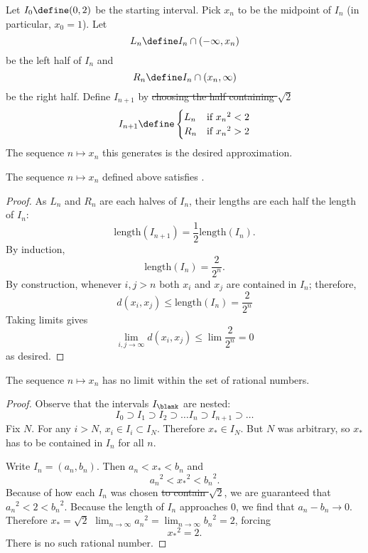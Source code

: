 \documentclass{scrartcl}
\newcommand{\dist}{d}
\begin{document}
\begin{defn}

  Let \(I_{0}\define(0,2)\) be the starting interval. Pick \(x_{n}\) to be the midpoint of \(I_{n}\) (in particular, \(x_{0}=1\)). Let \[L_{n}\define I_{n}\cap (-\infty,x_{n})\] be the left half of \(I_{n}\) and
  \[R_{n}\define I_{n}\cap (x_{n},\infty)\] be the right half.
  Define \(I_{{n+1}}\) by \sout{choosing the half containing \(\sqrt 2\)}
  \[
    I_{{n+1}} \define
    \begin{cases}
      L_{n}& \textrm{if } {x_{n}}^{2} < 2 \\
      R_{n}& \textrm{if } {x_{n}}^{2} > 2
    \end{cases}
  \]
  The sequence \(n \mapsto x_{n}\) this generates is the desired approximation.
\end{defn}
\begin{theorem}
  The sequence \(n\mapsto x_{n}\) defined above satisfies .
\end{theorem}
\begin{proof}
  As \(L_{n}\) and \(R_{n}\) are each halves of \(I_{n}\), their lengths are each half the length of \(I_{n}\):
  \[
    \textrm{length}(I_{n+1}) = \frac 1 2 \textrm{length}(I_{n}).
  \]
  By induction, \[
    \textrm{length}(I_{n}) = \frac{2}{2^{n}}.
  \]
  By construction, whenever \(i,j > n\) both \(x_{i}\) and \(x_{j}\) are contained in \(I_{n}\); therefore,
  \[
    \dist(x_{i},x_{j}) \leq \textrm{length}(I_{n}) = \frac{2}{2^{n}}
  \]
  Taking limits gives
  \[
    \lim_{{i,j}\to\infty} \dist(x_{i},x_{j}) \leq \lim \frac{2}{2^{n}} = 0
  \]
  as desired.
\end{proof}

\begin{theorem}
  The sequence \(n\mapsto x_{n}\) has no limit within the set of rational numbers.
\end{theorem}
\begin{proof}
  Observe that the intervals \(I_{\blank}\) are nested:
  \[
    I_{0} \supset I_{1} \supset I_{2} \supset \dots I_{n} \supset I_{n+1} \supset \dots
  \]
  Fix \(N\). For any \(i> N\), \(x_{i}\in I_{i} \subset I_{N}\). Therefore \(x_{*}\in I_{N}\). But \(N\) was arbitrary, so \(x_{*}\) has to be contained in \(I_{n}\) for all \(n\).

  Write \(I_{n} = (a_{n},b_{n})\). Then \(a_{n}< x_{*} < b_{n}\) and
  \[{a_{n}}^{2} < {x_{*}}^{2} < {b_{n}}^{2}.\]
  Because of how each \(I_{n}\) was chosen \sout{to contain \(\sqrt 2\)}, we are guaranteed that \({a_{n}}^{2}< 2 < {b_{n}}^{2}\). Because the length of \(I_{n}\) approaches \(0\), we find that \(a_{n}-b_{n}\to 0\). Therefore \sout{\(x_{*}=\sqrt 2\)} \(\lim_{{n\to\infty}} {a_{n}}^{2}=\lim_{{n\to\infty}}{b_{n}}^{2} = 2\), forcing
  \[
    {x_{*}}^{2} = 2.
  \]
  There is no such rational number.
\end{proof}
\end{document}
